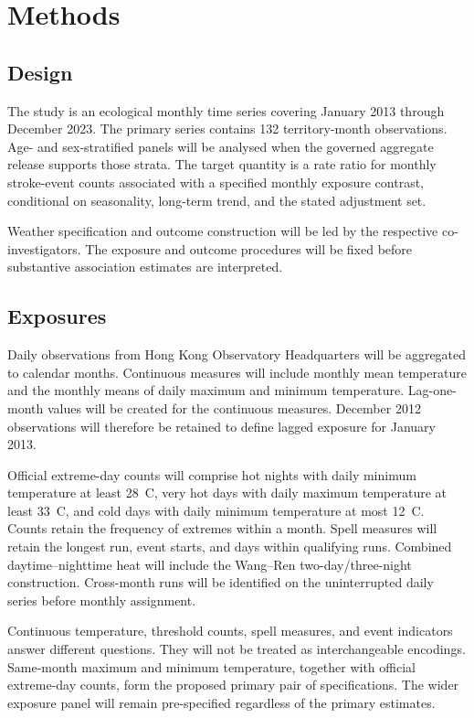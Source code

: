 \documentclass[11pt,a4paper]{article}
\begin{document}
\section{Methods}

\subsection{Design}

The study is an ecological monthly time series covering January 2013 through December 2023. The primary series contains 132 territory-month observations. Age- and sex-stratified panels will be analysed when the governed aggregate release supports those strata. The target quantity is a rate ratio for monthly stroke-event counts associated with a specified monthly exposure contrast, conditional on seasonality, long-term trend, and the stated adjustment set.

Weather specification and outcome construction will be led by the respective co-investigators. The exposure and outcome procedures will be fixed before substantive association estimates are interpreted.

\subsection{Exposures}

Daily observations from Hong Kong Observatory Headquarters will be aggregated to calendar months. Continuous measures will include monthly mean temperature and the monthly means of daily maximum and minimum temperature. Lag-one-month values will be created for the continuous measures. December 2012 observations will therefore be retained to define lagged exposure for January 2013.

Official extreme-day counts will comprise hot nights with daily minimum temperature at least 28~\textdegree C, very hot days with daily maximum temperature at least 33~\textdegree C, and cold days with daily minimum temperature at most 12~\textdegree C. Counts retain the frequency of extremes within a month. Spell measures will retain the longest run, event starts, and days within qualifying runs. Combined daytime--nighttime heat will include the Wang--Ren two-day/three-night construction. Cross-month runs will be identified on the uninterrupted daily series before monthly assignment.

Continuous temperature, threshold counts, spell measures, and event indicators answer different questions. They will not be treated as interchangeable encodings. Same-month maximum and minimum temperature, together with official extreme-day counts, form the proposed primary pair of specifications. The wider exposure panel will remain pre-specified regardless of the primary estimates.
\end{document}
